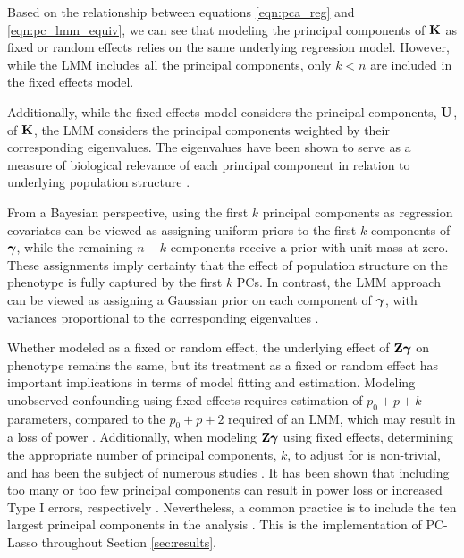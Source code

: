 Based on the relationship between equations \eqref{eqn:pca_reg} and \eqref{eqn:pc_lmm_equiv}, we can see that modeling the principal components of $\textbf{K}$ as fixed or random effects relies on the same underlying regression model. However, while the LMM includes all the principal components, only $k < n$ are included in the fixed effects model. 

Additionally, while the fixed effects model considers the principal components, $\textbf{U}$, of $\textbf{K}$, the LMM considers the principal components weighted by their corresponding eigenvalues. The eigenvalues have been shown to serve as a measure of biological relevance of each principal component in relation to underlying population structure \citep{hoffman2013correcting, price2006principal}. 

From a Bayesian perspective, using the first $k$ principal components as regression covariates can be viewed as assigning uniform priors to the first $k$ components of $\boldsymbol{\gamma}$, while the remaining $n - k$ components receive a prior with unit mass at zero. These assignments imply certainty that the effect of population structure on the phenotype is fully captured by the first $k$ PCs. In contrast, the LMM approach can be viewed as assigning a Gaussian prior on each component of $\boldsymbol{\gamma}$, with variances proportional to the corresponding eigenvalues \citep{astle2009population}. 

Whether modeled as a fixed or random effect, the underlying effect of $\textbf{Z} \boldsymbol{\gamma}$ on phenotype remains the same, but its treatment as a fixed or random effect has important implications in terms of model fitting and estimation. Modeling unobserved confounding using fixed effects requires estimation of $p_0 + p + k$ parameters, compared to the $p_0 + p + 2$ required of an LMM, which may result in a loss of power \citep{zhang2015principal}. Additionally, when modeling $\textbf{Z} \boldsymbol{\gamma}$ using fixed effects, determining the appropriate number of principal components, $k$, to adjust for is non-trivial, and has been the subject of numerous studies \citep{patterson2006population, zhao2018practical}. It has been shown that including too many or too few principal components can result in power loss or increased Type I errors, respectively \citep{zhang2015principal}. Nevertheless, a common practice is to include the ten largest principal components in the analysis \citep{zhao2018practical}. This is the implementation of PC-Lasso throughout Section \ref{sec:results}.



